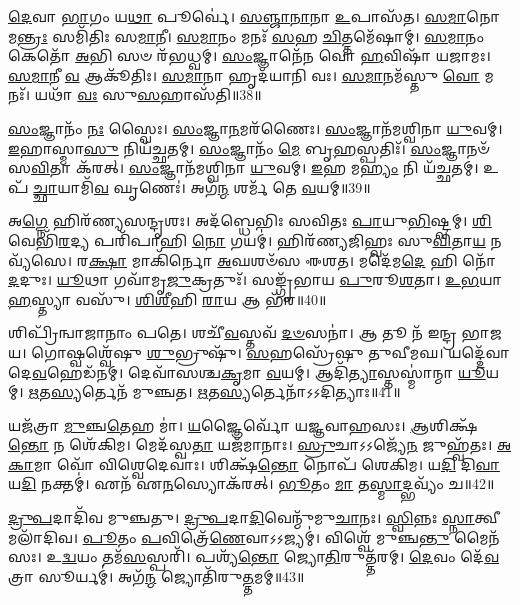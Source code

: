\-\ul{𑌦𑍇}\-𑌵𑌾 \ul{𑌭𑌾}\-𑌗𑌂 𑌯\-\ul{𑌥𑌾} 𑌪𑍂𑌰𑍍𑌵𑍇॑।
\-\ul{𑌸}\-\-\ul{𑌞𑍍𑌜𑌾}\-\-\ul{𑌨𑌾}\-𑌨𑌾 \ul{𑌉}\-𑌪𑌾𑌸᳴𑌤।
\-\ul{𑌸}\-\-\ul{𑌮𑌾}\-𑌨𑍋 𑌮\-\ul{𑌨𑍍𑌤𑍍𑌰𑌃} 𑌸𑌮𑌿᳴𑌤𑌿𑌃 𑌸\-\ul{𑌮𑌾}\-𑌨𑍀।
\-\ul{𑌸}\-\-\ul{𑌮𑌾}\-𑌨𑌂 𑌮𑌨𑌃᳴ \ul{𑌸}\-𑌹 \ul{𑌚𑌿}\-𑌤𑍍𑌤𑌮𑍇᳴𑌷𑌾𑌮𑍍।
\-\ul{𑌸}\-\-\ul{𑌮𑌾}\-𑌨𑌂 𑌕𑍇𑌤𑍋᳴ \ul{𑌅}\-𑌭𑌿 𑌸𑍞 𑌰᳴𑌭𑌧𑍍𑌵𑌮𑍍।
\-\ul{𑌸𑌂}\-𑌜𑍍𑌞𑌾𑌨𑍇᳴𑌨 𑌵𑍋 \ul{𑌹}\-𑌵𑌿𑌷𑌾᳴ 𑌯𑌜𑌾𑌮𑌃।
\-\ul{𑌸}\-\-\ul{𑌮𑌾}\-𑌨𑍀 \ul{𑌵} 𑌆𑌕𑍂᳴𑌤𑌿𑌃।
\-\ul{𑌸}\-\-\ul{𑌮𑌾}\-𑌨𑌾 𑌹𑍃𑌦᳴𑌯𑌾𑌨𑌿 𑌵𑌃।
\-\ul{𑌸}\-\-\ul{𑌮𑌾}\-𑌨𑌮᳴𑌸𑍍𑌤𑍁 \ul{𑌵𑍋} 𑌮𑌨𑌃᳴।
𑌯𑌥𑌾᳴ \ul{𑌵𑌃} 𑌸𑍁\-\ul{𑌸}\-𑌹𑌾𑌸᳴𑌤𑌿॥38॥

\-\ul{𑌸𑌂}\-𑌜𑍍𑌞𑌾𑌨𑌂᳴ \ul{𑌨𑌃} 𑌸𑍍𑌵𑍈𑌃।
\-\ul{𑌸𑌂}\-𑌜𑍍𑌞𑌾\-\ul{𑌨}\-𑌮𑌰᳴𑌣𑍈𑌃।
\-\ul{𑌸𑌂}\-𑌜𑍍𑌞𑌾𑌨᳴𑌮𑌶𑍍𑌵𑌿𑌨𑌾 \ul{𑌯𑍁}\-𑌵𑌮𑍍।
\-\ul{𑌇}\-𑌹𑌾𑌸𑍍𑌮𑌾\-\ul{𑌸𑍁} 𑌨𑌿𑌯᳴𑌚𑍍𑌛𑌤𑌮𑍍।
\-\ul{𑌸𑌂}\-𑌜𑍍𑌞𑌾𑌨𑌂᳴ \ul{𑌮𑍇} 𑌬𑍃\-\ul{𑌹}\-𑌸𑍍𑌪𑌤𑌿𑌃᳴।
\-\ul{𑌸𑌂}\-𑌜𑍍𑌞𑌾𑌨𑍞᳴ 𑌸\-\ul{𑌵𑌿}\-𑌤𑌾 𑌕᳴𑌰𑌤𑍍।
\-\ul{𑌸𑌂}\-𑌜𑍍𑌞𑌾𑌨᳴𑌮𑌶𑍍𑌵𑌿𑌨𑌾 \ul{𑌯𑍁}\-𑌵𑌮𑍍।
\-\ul{𑌇}\-𑌹 𑌮\-\ul{𑌹𑍍𑌯𑌂} 𑌨𑌿 𑌯᳴𑌚𑍍𑌛𑌤𑌮𑍍।
𑌉𑌪᳴ \ul{𑌚𑍍𑌛𑌾}\-𑌯𑌾𑌮𑌿᳴\-\ul{𑌵} 𑌘𑍃𑌣𑍇𑌃॑।
𑌅𑌗᳴\-\ul{𑌨𑍍𑌮} 𑌶𑌰𑍍𑌮᳴ 𑌤𑍇 \ul{𑌵}\-𑌯𑌮𑍍॥39॥

𑌅\-\ul{𑌗𑍍𑌨𑍇} 𑌹𑌿𑌰᳴𑌣𑍍𑌯𑌸𑌨𑍍𑌦𑍃𑌶𑌃।
𑌅𑌦᳴𑌬𑍍𑌧𑍇𑌭𑌿𑌃 𑌸𑌵𑌿𑌤𑌃 \ul{𑌪𑌾}\-𑌯𑍁\-\ul{𑌭𑌿}\-𑌷𑍍𑌟𑍍𑌵𑌮𑍍।
\-\ul{𑌶𑌿}\-𑌵𑍇𑌭𑌿᳴\-\ul{𑌰}\-𑌦𑍍𑌯 𑌪𑌰𑌿᳴𑌪𑌾𑌹𑌿 \ul{𑌨𑍋} 𑌗𑌯𑌮𑍍॑।
𑌹𑌿𑌰᳴𑌣𑍍𑌯𑌜𑌿𑌹𑍍𑌵𑌃 𑌸𑍁\-\ul{𑌵𑌿}\-𑌤𑌾\-\ul{𑌯} 𑌨𑌵𑍍𑌯᳴𑌸𑍇।
𑌰\-\ul{𑌕𑍍𑌷𑌾} 𑌮𑌾𑌕𑌿᳴𑌰𑍍𑌨𑍋 \ul{𑌅}\-𑌘𑌶𑍞᳴𑌸 𑌈𑌶𑌤।
𑌮𑌦𑍇᳴𑌮\-\ul{𑌦𑍇} 𑌹𑌿 𑌨𑍋᳴ \ul{𑌦}\-𑌦𑍁𑌃।
\-\ul{𑌯𑍂}\-𑌥𑌾 𑌗𑌵𑌾᳴𑌮𑍃\-\ul{𑌜𑍁}\-𑌕𑍍𑌰𑌤𑍁𑌃᳴।
𑌸𑌙𑍍𑌗𑍃᳴𑌭𑌾𑌯 \ul{𑌪𑍁}\-𑌰𑍂\-\ul{𑌶}\-𑌤𑌾।
\-\ul{𑌉}\-\-\ul{𑌭}\-𑌯𑌾 \ul{𑌹}\-𑌸𑍍𑌤𑍍𑌯𑌾 𑌵𑌸𑍁᳴।
\-\ul{𑌶𑌿}\-\-\ul{𑌶𑍀}\-𑌹𑌿 \ul{𑌰𑌾}\-𑌯 𑌆 𑌭᳴𑌰॥40॥

𑌶𑌿𑌪𑍍𑌰𑌿᳴𑌨𑍍𑌵𑌾𑌜𑌾𑌨𑌾𑌂 𑌪𑌤𑍇।
𑌶𑌚𑍀᳴\-\ul{𑌵}\-𑌸𑍍𑌤𑌵᳴ \ul{𑌦}\-\-\ul{𑍞}\-𑌸𑌨𑌾॑।
𑌆 𑌤𑍂 𑌨᳴ 𑌇𑌨𑍍𑌦𑍍𑌰 𑌭𑌾𑌜𑌯।
𑌗𑍋𑌷𑍍𑌵𑌶𑍍𑌵𑍇᳴𑌷𑍁 \ul{𑌶𑍁}\-𑌭𑍍𑌰𑍁𑌷𑍁᳴।
\-\ul{𑌸}\-𑌹𑌸𑍍𑌰𑍇᳴𑌷𑍁 𑌤𑍁𑌵𑍀𑌮𑌘।
𑌯𑌦𑍍𑌦𑍇᳴𑌵𑌾 𑌦𑍇\-\ul{𑌵}\-𑌹𑍇𑌡᳴𑌨𑌮𑍍।
𑌦𑍇𑌵𑌾᳴𑌸𑌶𑍍𑌚\-\ul{𑌕𑍃}\-𑌮𑌾 \ul{𑌵}\-𑌯𑌮𑍍।
𑌆𑌦𑌿᳴\-\ul{𑌤𑍍𑌯𑌾}\-𑌸𑍍𑌤𑌸𑍍𑌮𑌾॑𑌨𑍍𑌮𑌾 \ul{𑌯𑍂}\-𑌯𑌮𑍍।
\-\ul{𑌋}\-𑌤\-\ul{𑌸𑍍𑌯}\-𑌰𑍍𑌤𑍇𑌨᳴ 𑌮𑍁𑌞𑍍𑌚𑌤।
\-\ul{𑌋}\-𑌤\-\ul{𑌸𑍍𑌯}\-𑌰𑍍𑌤𑍇𑌨𑌾᳴𑌽𑌽𑌦𑌿𑌤𑍍𑌯𑌾𑌃॥41॥

𑌯𑌜᳴𑌤𑍍𑌰𑌾 \ul{𑌮𑍁}\-𑌞𑍍𑌚\-\ul{𑌤𑍇}\-𑌹 𑌮𑌾॑।
\-\ul{𑌯}\-𑌜𑍍𑌞𑍈𑌰𑍍𑌵𑍋᳴ 𑌯𑌜𑍍𑌞𑌵𑌾𑌹𑌸𑌃।
\-\ul{𑌆}\-𑌶𑌿𑌕𑍍𑌷᳴\-\ul{𑌨𑍍𑌤𑍋} 𑌨 𑌶𑍇᳴𑌕𑌿𑌮।
𑌮𑍇𑌦᳴𑌸𑍍𑌵\-\ul{𑌤𑌾} 𑌯𑌜᳴𑌮𑌾𑌨𑌾𑌃।
\-\ul{𑌸𑍍𑌰𑍁}\-𑌚𑌾\-𑌽𑌽𑌜𑍍𑌯𑍇᳴\-\ul{𑌨} 𑌜𑍁𑌹𑍍𑌵᳴𑌤𑌃।
\-\ul{𑌅}\-\-\ul{𑌕𑌾}\-𑌮𑌾 𑌵𑍋᳴ 𑌵𑌿𑌶𑍍𑌵𑍇𑌦𑍇𑌵𑌾𑌃।
𑌶𑌿𑌕𑍍𑌷᳴\-\ul{𑌨𑍍𑌤𑍋} 𑌨𑍋𑌪᳴ 𑌶𑍇𑌕𑌿𑌮।
𑌯\-\ul{𑌦𑌿} 𑌦𑌿\-\ul{𑌵𑌾} 𑌯\-\ul{𑌦𑌿} 𑌨𑌕𑍍𑌤𑌮𑍍॑।
𑌏𑌨᳴ 𑌏\-\ul{𑌨}\-𑌸𑍍𑌯𑍋𑌕᳴𑌰𑌤𑍍।
\-\ul{𑌭𑍂}\-𑌤𑌂 \ul{𑌮𑌾} 𑌤\-\ul{𑌸𑍍𑌮𑌾}\-𑌦𑍍𑌭𑌵𑍍𑌯𑌂᳴ 𑌚॥42॥

\-\ul{𑌦𑍍𑌰𑍁}\-\-\ul{𑌪}\-𑌦𑌾𑌦𑌿᳴𑌵 𑌮𑍁𑌞𑍍𑌚𑌤𑍁।
\-\ul{𑌦𑍍𑌰𑍁}\-\-\ul{𑌪}\-𑌦𑌾\-\ul{𑌦𑌿}\-𑌵𑍇𑌨𑍍𑌮𑍁᳴𑌮𑍁\-\ul{𑌚𑌾}\-𑌨𑌃।
\-\ul{𑌸𑍍𑌵𑌿}\-𑌨𑍍𑌨𑌃 \ul{𑌸𑍍𑌨𑌾}\-𑌤𑍍𑌵𑍀 𑌮𑌲𑌾᳴𑌦𑌿𑌵।
\-\ul{𑌪𑍂}\-𑌤𑌂 \ul{𑌪}\-𑌵𑌿𑌤𑍍𑌰𑍇᳴\-\ul{𑌣𑍇}\-𑌵𑌾𑌽𑌽𑌜𑍍𑌯𑌮𑍍॑।
𑌵𑌿𑌶𑍍𑌵𑍇᳴ 𑌮𑍁𑌞𑍍𑌚\-\ul{𑌨𑍍𑌤𑍁} 𑌮𑍈𑌨᳴𑌸𑌃।
𑌉\-\ul{𑌦𑍍𑌵}\-𑌯𑌂 𑌤𑌮᳴\-\ul{𑌸}\-𑌸𑍍𑌪𑌰𑌿᳴।
𑌪𑌶𑍍𑌯᳴\-\ul{𑌨𑍍𑌤𑍋} 𑌜𑍍𑌯𑍋\-\ul{𑌤𑌿}\-𑌰𑍁𑌤𑍍𑌤᳴𑌰𑌮𑍍।
\-\ul{𑌦𑍇}\-𑌵𑌂 𑌦𑍇᳴\-\ul{𑌵}\-𑌤𑍍𑌰𑌾 𑌸𑍂𑌰𑍍𑌯𑌮𑍍॑।
𑌅𑌗᳴\-\ul{𑌨𑍍𑌮} 𑌜𑍍𑌯𑍋𑌤𑌿᳴𑌰𑍁\-\ul{𑌤𑍍𑌤}\-𑌮𑌮𑍍॥43॥\anuvakamend[𑌤𑌵᳴ 𑌕𑍃\-\ul{𑌧𑌿} 𑌵\-\ul{𑌨}\-𑌸𑍍𑌪𑌤𑍀॑𑌞𑍍𑌜𑌾𑌨\-\ul{𑌤𑌾}\-𑌮𑌸᳴𑌤𑌿 \ul{𑌵}\-𑌯𑌂 𑌭᳴𑌰𑌾𑌦𑌿𑌤𑍍𑌯𑌾\-\ul{𑌶𑍍𑌚} 𑌨𑌵᳴ 𑌚]

